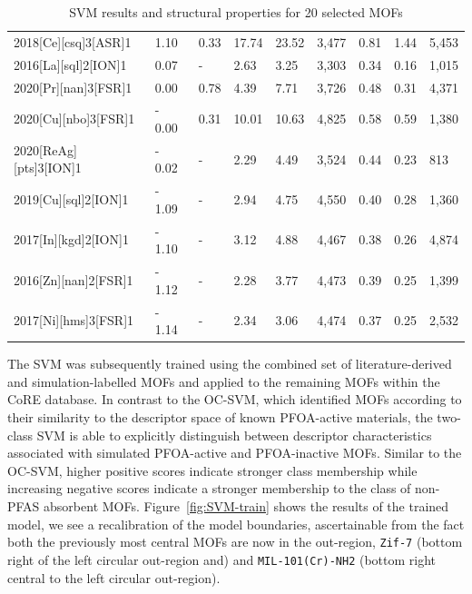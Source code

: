 \documentclass[twoside,twocolumn,9pt]{article}
\begin{document}
\begin{table}[h]
\begin{tabular}{@{}lllllllll@{}}
		2018{[}Ce{]}{[}csq{]}3{[}ASR{]}1   & 1.10       & 0.33 & 17.74 & 23.52 & 3,477 & 0.81 & 1.44 & 5,453 \\
		2016{[}La{]}{[}sql{]}2{[}ION{]}1  & 0.07       & -    & 2.63  & 3.25  & 3,303 & 0.34 & 0.16 & 1,015 \\
		2020{[}Pr{]}{[}nan{]}3{[}FSR{]}1   & 0.00       & 0.78 & 4.39  & 7.71  & 3,726 & 0.48 & 0.31 & 4,371 \\
		2020{[}Cu{]}{[}nbo{]}3{[}FSR{]}1   & - 0.00    & 0.31 & 10.01 & 10.63 & 4,825 & 0.58 & 0.59 & 1,380 \\
		2020{[}ReAg{]}{[}pts{]}3{[}ION{]}1 & - 0.02    & -    & 2.29  & 4.49  & 3,524 & 0.44 & 0.23 & 813 \\
		2019{[}Cu{]}{[}sql{]}2{[}ION{]}1   & - 1.09    & -    & 2.94  & 4.75  & 4,550 & 0.40 & 0.28 & 1,360 \\
		2017{[}In{]}{[}kgd{]}2{[}ION{]}1   & - 1.10    & -    & 3.12  & 4.88  & 4,467 & 0.38 & 0.26 & 4,874 \\
		2016{[}Zn{]}{[}nan{]}2{[}FSR{]}1   & - 1.12    & -    & 2.28  & 3.77  & 4,473 & 0.39 & 0.25 & 1,399 \\
		2017{[}Ni{]}{[}hms{]}3{[}FSR{]}1   & - 1.14    & -    & 2.34  & 3.06  & 4,474 & 0.37 & 0.25 & 2,532 \\
		\bottomrule
	\end{tabular}
	\caption{SVM results and structural properties for 20 selected MOFs}
	\label{tab:SVM-result}
\end{table}

The SVM was subsequently trained using the combined set of literature-derived and simulation-labelled MOFs and applied to the remaining MOFs within the CoRE database. In contrast to the OC-SVM, which identified MOFs according to their similarity to the descriptor space of known PFOA-active materials, the two-class SVM is able to explicitly distinguish between descriptor characteristics associated with simulated PFOA-active and PFOA-inactive MOFs. Similar to the OC-SVM, higher positive scores indicate stronger class membership while increasing negative scores indicate a stronger membership to the class of non-PFAS absorbent MOFs. Figure~\ref{fig:SVM-train} shows the results of the trained model, we see a recalibration of the model boundaries, ascertainable from the fact both the previously most central MOFs are now in the out-region, \texttt{Zif-7} (bottom right of the left circular out-region and) and \texttt{MIL-101(Cr)-NH2} (bottom right central to the left circular out-region).
\end{document}
